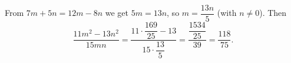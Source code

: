 From $7m+5n=12m-8n$ we get $5m=13n$, so $m=\dfrac{13n}{5}$ (with $n\ne0$). Then
\[\dfrac{11m^2-13n^2}{15mn}=\dfrac{11\cdot\dfrac{169}{25}-13}{15\cdot\dfrac{13}{5}}=\dfrac{\dfrac{1534}{25}}{39}=\boxed{\dfrac{118}{75}}.\]
